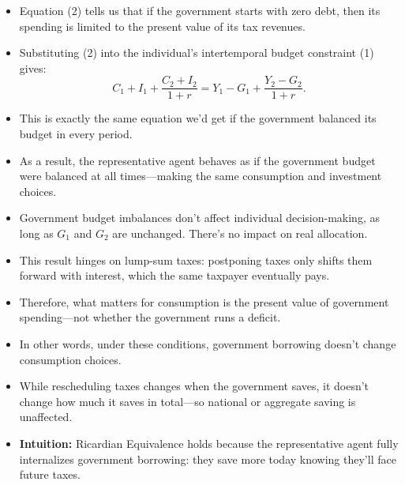 \documentclass[12pt]{article}
\begin{document}
\begin{itemize}
\item Equation (2) tells us that if the government starts with zero debt, then its spending is limited to the present value of its tax revenues.

\item Substituting (2) into the individual’s intertemporal budget constraint (1) gives:
\[
C_1 + I_1 + \frac{C_2 + I_2}{1 + r} = Y_1 - G_1 + \frac{Y_2 - G_2}{1 + r}.
\]

\item This is exactly the same equation we’d get if the government balanced its budget in every period.

\item As a result, the representative agent behaves as if the government budget were balanced at all times—making the same consumption and investment choices.

\item Government budget imbalances don’t affect individual decision-making, as long as $G_1$ and $G_2$ are unchanged. There’s no impact on real allocation.

\item This result hinges on lump-sum taxes: postponing taxes only shifts them forward with interest, which the same taxpayer eventually pays.

\item Therefore, what matters for consumption is the present value of government spending—not whether the government runs a deficit.

\item In other words, under these conditions, government borrowing doesn’t change consumption choices.

\item While rescheduling taxes changes when the government saves, it doesn't change how much it saves in total—so national or aggregate saving is unaffected.

\item \textbf{Intuition:} Ricardian Equivalence holds because the representative agent fully internalizes government borrowing: they save more today knowing they'll face future taxes.
\end{itemize}
\end{document}
